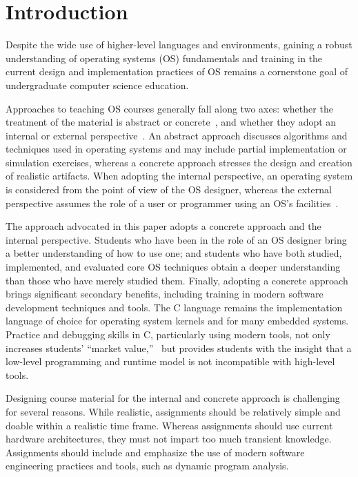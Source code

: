 \section{Introduction}
\label{sec:intro}

Despite the wide use of higher-level languages and environments, gaining a robust
understanding of operating systems (OS) fundamentals and training in the current design and
implementation practices of OS remains a cornerstone goal of 
undergraduate computer science education.

Approaches to teaching OS courses generally fall along two axes: 
whether the treatment of the material is abstract or 
concrete~\cite{Hovemeyer2004Running}, and whether they adopt an
internal or external perspective~\cite{Deitel2003Operating}.
An abstract approach discusses algorithms and techniques used in operating 
systems and may include partial implementation or simulation exercises,
whereas a concrete approach stresses the design and creation of 
realistic artifacts.
When adopting the internal perspective, an operating system is considered
from the point of view of the OS designer, whereas the external perspective 
assumes the role of a user or programmer using an OS's 
facilities~\cite{Bryant2002Computer}.

The approach advocated in this paper adopts a concrete approach and the internal
perspective.  Students who have been in the role of an
OS designer bring a better understanding of how to use one; and students
who have both studied, implemented, and evaluated core OS techniques obtain 
a deeper understanding than those who have merely studied them.
Finally, adopting a concrete approach brings significant secondary
benefits, including training in modern software development techniques
and tools.  The C language remains the implementation language of choice
for operating system kernels and for many embedded systems.
Practice and debugging skills in C, particularly using modern tools,
not only increases students' ``market value,''~\cite{1292450} but provides students with
the insight that a low-level programming and runtime model is not incompatible
with high-level tools.

Designing course material for the internal and concrete 
approach is challenging for several reasons.  While realistic, 
assignments should be relatively simple and doable within a realistic time frame.  
Whereas assignments should use current hardware architectures, 
they must not impart too much transient knowledge.
Assignments should include and emphasize the use of modern software 
engineering practices and tools, such as dynamic program analysis.

